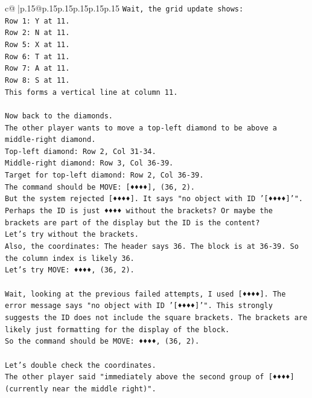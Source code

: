 \documentclass{article}
\begin{document}
{\begin{supertabular}{c@{$\;$}|p{.15\linewidth}@{}p{.15\linewidth}p{.15\linewidth}p{.15\linewidth}p{.15\linewidth}p{.15\linewidth}}
{{{\texttt{Wait, the grid update shows:} \\
\texttt{Row 1: Y at 11.} \\
\texttt{Row 2: N at 11.} \\
\texttt{Row 5: X at 11.} \\
\texttt{Row 6: T at 11.} \\
\texttt{Row 7: A at 11.} \\
\texttt{Row 8: S at 11.} \\
\texttt{This forms a vertical line at column 11.} \\
\\ 
\texttt{Now back to the diamonds.} \\
\texttt{The other player wants to move a top{-}left diamond to be above a middle{-}right diamond.} \\
\texttt{Top{-}left diamond: Row 2, Col 31{-}34.} \\
\texttt{Middle{-}right diamond: Row 3, Col 36{-}39.} \\
\texttt{Target for top{-}left diamond: Row 2, Col 36{-}39.} \\
\texttt{The command should be MOVE: {[}♦♦♦♦{]}, (36, 2).} \\
\texttt{But the system rejected {[}♦♦♦♦{]}. It says "no object with ID '{[}♦♦♦♦{]}'".} \\
\texttt{Perhaps the ID is just ♦♦♦♦ without the brackets? Or maybe the brackets are part of the display but the ID is the content?} \\
\texttt{Let's try without the brackets.} \\
\texttt{Also, the coordinates: The header says 36. The block is at 36{-}39. So the column index is likely 36.} \\
\texttt{Let's try MOVE: ♦♦♦♦, (36, 2).} \\
\\ 
\texttt{Wait, looking at the previous failed attempts, I used {[}♦♦♦♦{]}. The error message says "no object with ID '{[}♦♦♦♦{]}'". This strongly suggests the ID does not include the square brackets. The brackets are likely just formatting for the display of the block.} \\
\texttt{So the command should be MOVE: ♦♦♦♦, (36, 2).} \\
\\ 
\texttt{Let's double check the coordinates.} \\
\texttt{The other player said "immediately above the second group of {[}♦♦♦♦{]} (currently near the middle right)".} \\
}}}
\end{supertabular}}
\end{document}
